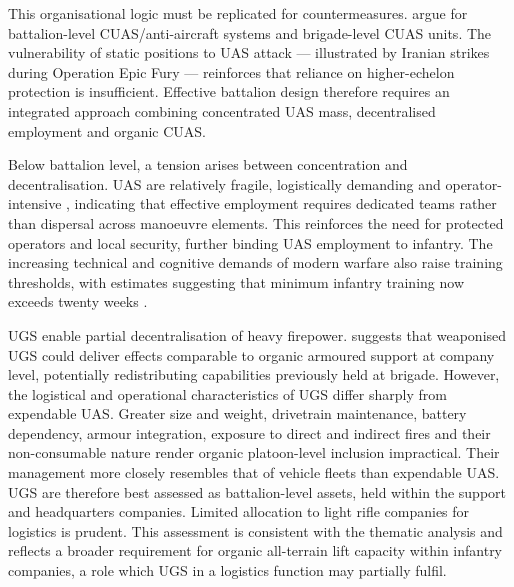 This organisational logic must be replicated for countermeasures. \textcite[2]{WATLING_2024} argue for battalion-level CUAS/anti-aircraft systems and brigade-level CUAS units. The vulnerability of static positions to UAS attack --- illustrated by Iranian strikes during Operation Epic Fury \parencite{aljazeera_2026_03_15_fpv_drone_us_base_iraq} --- reinforces that reliance on higher-echelon protection is insufficient. Effective battalion design therefore requires an integrated approach combining concentrated UAS mass, decentralised employment and organic CUAS.

Below battalion level, a tension arises between concentration and decentralisation. UAS are relatively fragile, logistically demanding and operator-intensive \parencite{dan_participant_1,dan_participant_6}, indicating that effective employment requires dedicated teams rather than dispersal across manoeuvre elements. This reinforces the need for protected operators and local security, further binding UAS employment to infantry. The increasing technical and cognitive demands of modern warfare also raise training thresholds, with estimates suggesting that minimum infantry training now exceeds twenty weeks \parencite{watling_2025_panel,darragh_participant_4}. 

UGS enable partial decentralisation of heavy firepower. \textcite[40:00--42:00]{lyle_23_interview} suggests that weaponised UGS could deliver effects comparable to organic armoured support at company level, potentially redistributing capabilities previously held at brigade. 
However, the logistical and operational characteristics of UGS differ sharply from expendable UAS. Greater size and weight, drivetrain maintenance, battery dependency, armour integration, exposure to direct and indirect fires and their non-consumable nature render organic platoon-level inclusion impractical. Their management more closely resembles that of vehicle fleets than expendable UAS. UGS are therefore best assessed as battalion-level assets, held within the support and headquarters companies. Limited allocation to light rifle companies for logistics is prudent. This assessment is consistent with the thematic analysis and reflects a broader requirement for organic all-terrain lift capacity within infantry companies, a role which UGS in a logistics function may partially fulfil.



